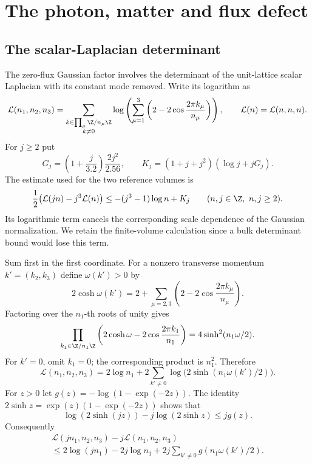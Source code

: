 \section{The photon, matter and flux defect}\label{sec:vtm-defect}

\subsection{The scalar-Laplacian determinant}

The zero-flux Gaussian factor involves the determinant of the
unit-lattice scalar Laplacian with its constant mode removed.
Write its logarithm as
\[
 \mathcal L(n_1,n_2,n_3)
  =\sum_{\substack{k\in\prod_\mu\Z/n_\mu\Z\\k\ne0}}
      \log\left(\sum_{\mu=1}^3
                       \left(2-2\cos\frac{2\pi k_\mu}{n_\mu}\right)\right),
 \qquad \mathcal L(n)=\mathcal L(n,n,n).
\]
For $j\ge2$ put
\[
 G_j=\left(1+\frac j{3.2}\right)\frac{2j^2}{2.56},\qquad
 K_j=(1+j+j^2)(\log j+jG_j).
\]
The estimate used for the two reference volumes is
\begin{equation}\label{eq:transfer-photon-logdet}
 \frac12\bigl(\mathcal L(jn)-j^3\mathcal L(n)\bigr)
              \le-(j^3-1)\log n+K_j
                   \qquad(n,j\in\Z,\ n,j\ge2).
\end{equation}
Its logarithmic term cancels the corresponding scale dependence
of the Gaussian normalization. We retain the finite-volume
calculation since a bulk determinant bound would lose this term.

Sum first in the first coordinate. For a nonzero transverse
momentum $k'=(k_2,k_3)$ define $\omega(k')>0$ by
\[
 2\cosh\omega(k')
     =2+\sum_{\mu=2,3}
                 \left(2-2\cos\frac{2\pi k_\mu}{n_\mu}\right).
\]
Factoring over the $n_1$-th roots of unity gives
\[
 \prod_{k_1\in\Z/n_1\Z}
       \left(2\cosh\omega-2\cos\frac{2\pi k_1}{n_1}\right)
                       =4\sinh^2(n_1\omega/2).
\]
For $k'=0$, omit $k_1=0$; the corresponding product is $n_1^2$.
Therefore
\begin{equation}\label{eq:transfer-photon-one-direction}
 \mathcal L(n_1,n_2,n_3)
   =2\log n_1+
       2\sum_{k'\ne0}\log\bigl(2\sinh(n_1\omega(k')/2)\bigr).
\end{equation}
For $z>0$ let $g(z)=-\log(1-\exp(-2z))$.
The identity $2\sinh z=\exp(z)(1-\exp(-2z))$ shows that
\[
 \log(2\sinh(jz))-j\log(2\sinh z)\le jg(z).
\]
Consequently
\begin{multline}\label{eq:transfer-photon-side-difference}
 \mathcal L(jn_1,n_2,n_3)-j\mathcal L(n_1,n_2,n_3)\\
 \le2\log(jn_1)-2j\log n_1
                       +2j\sum_{k'\ne0}g(n_1\omega(k')/2).
\end{multline}

